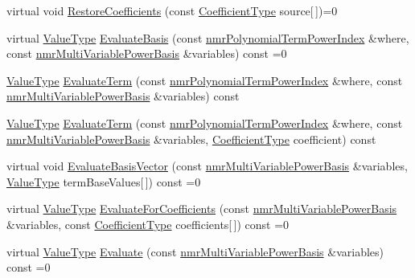 \begin{DoxyCompactItemize}
virtual void \hyperlink{classnmr_polynomial_base_a8e788ad20bd0571154016e52c8747c07}{Restore\+Coefficients} (const \hyperlink{classnmr_polynomial_base_a8693efdfc8585ccb49abea69f74f3eef}{Coefficient\+Type} source\mbox{[}$\,$\mbox{]})=0
\item 
virtual \hyperlink{classnmr_polynomial_base_a72f0bc16b225e4708bcf15a77ba206e3}{Value\+Type} \hyperlink{classnmr_polynomial_base_aee2e7c15f20165c2961a82f8eb0a2dc6}{Evaluate\+Basis} (const \hyperlink{classnmr_polynomial_term_power_index}{nmr\+Polynomial\+Term\+Power\+Index} \&where, const \hyperlink{classnmr_multi_variable_power_basis}{nmr\+Multi\+Variable\+Power\+Basis} \&variables) const =0
\item 
\hyperlink{classnmr_polynomial_base_a72f0bc16b225e4708bcf15a77ba206e3}{Value\+Type} \hyperlink{classnmr_polynomial_base_ae75be30b3efcf089f1af19f5e4c8befe}{Evaluate\+Term} (const \hyperlink{classnmr_polynomial_term_power_index}{nmr\+Polynomial\+Term\+Power\+Index} \&where, const \hyperlink{classnmr_multi_variable_power_basis}{nmr\+Multi\+Variable\+Power\+Basis} \&variables) const 
\item 
\hyperlink{classnmr_polynomial_base_a72f0bc16b225e4708bcf15a77ba206e3}{Value\+Type} \hyperlink{classnmr_polynomial_base_ad9406971e6ba806a5119aea07413ed03}{Evaluate\+Term} (const \hyperlink{classnmr_polynomial_term_power_index}{nmr\+Polynomial\+Term\+Power\+Index} \&where, const \hyperlink{classnmr_multi_variable_power_basis}{nmr\+Multi\+Variable\+Power\+Basis} \&variables, \hyperlink{classnmr_polynomial_base_a8693efdfc8585ccb49abea69f74f3eef}{Coefficient\+Type} coefficient) const 
\item 
virtual void \hyperlink{classnmr_polynomial_base_a8a52666a2ac9b19714aee3ca0da0194a}{Evaluate\+Basis\+Vector} (const \hyperlink{classnmr_multi_variable_power_basis}{nmr\+Multi\+Variable\+Power\+Basis} \&variables, \hyperlink{classnmr_polynomial_base_a72f0bc16b225e4708bcf15a77ba206e3}{Value\+Type} term\+Base\+Values\mbox{[}$\,$\mbox{]}) const =0
\item 
virtual \hyperlink{classnmr_polynomial_base_a72f0bc16b225e4708bcf15a77ba206e3}{Value\+Type} \hyperlink{classnmr_polynomial_base_a2536de8569d074248e1ddc892bb4cb6d}{Evaluate\+For\+Coefficients} (const \hyperlink{classnmr_multi_variable_power_basis}{nmr\+Multi\+Variable\+Power\+Basis} \&variables, const \hyperlink{classnmr_polynomial_base_a8693efdfc8585ccb49abea69f74f3eef}{Coefficient\+Type} coefficients\mbox{[}$\,$\mbox{]}) const =0
\item 
virtual \hyperlink{classnmr_polynomial_base_a72f0bc16b225e4708bcf15a77ba206e3}{Value\+Type} \hyperlink{classnmr_polynomial_base_a1df2433e0fe5c22d7d80934a10868a09}{Evaluate} (const \hyperlink{classnmr_multi_variable_power_basis}{nmr\+Multi\+Variable\+Power\+Basis} \&variables) const =0

\end{DoxyCompactItemize}
